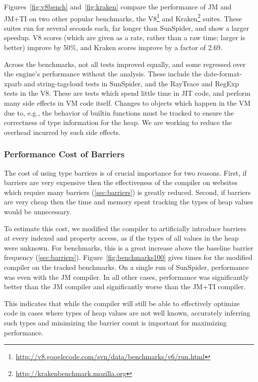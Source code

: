 Figures~\ref{fig:v8bench} and~\ref{fig:kraken} compare the performance of JM and JM+TI
on two other popular benchmarks, the V8\footnote{\url{http://v8.googlecode.com/svn/data/benchmarks/v6/run.html}}
and Kraken\footnote{\url{http://krakenbenchmark.mozilla.org}} suites.
These suites run for several seconds each, far longer than SunSpider,
and show a larger speedup.
V8 scores (which are given as a rate, rather than a raw time; larger is better) improve by 50\%,
and Kraken scores improve by a factor of 2.69.

Across the benchmarks, not all tests improved equally, and some regressed over
the engine's performance without the analysis.
These include the date-format-xparb and string-tagcloud tests in SunSpider,
and the RayTrace and RegExp tests in the V8.
These are tests which spend little time in JIT code, and perform many side
effects in VM code itself.
Changes to objects which happen in the VM due to, e.g., the behavior of
builtin functions must be tracked to ensure the correctness of type
information for the heap.
We are working to reduce the overhead incurred by such side effects.

\subsubsection{Performance Cost of Barriers}
\label{sec:barrier_cost}

The cost of using type barriers is of crucial importance for two reasons.
First, if barriers are very expensive then the effectiveness of the compiler
on websites which require many barriers (\Section\ref{sec:barriers})
is greatly reduced.
Second, if barriers are very cheap then the time and memory spent
tracking the types of heap values would be unnecessary.

To estimate this cost, we modified the compiler to artificially introduce
barriers at every indexed and property access, as if the types of all values
in the heap were unknown.
For benchmarks, this is a great increase above the baseline barrier
frequency (\Section\ref{sec:barriers}).
Figure~\ref{fig:benchmarks100} gives times for the modified compiler on the
tracked benchmarks.
On a single run of SunSpider, performance was even with the JM
compiler.
In all other cases, performance was significantly better than the JM
compiler and significantly worse than the JM+TI compiler.

This indicates that while the compiler will still be able to effectively
optimize code in cases where types of heap values are not well known,
accurately inferring such types and minimizing the barrier count is important
for maximizing performance.

